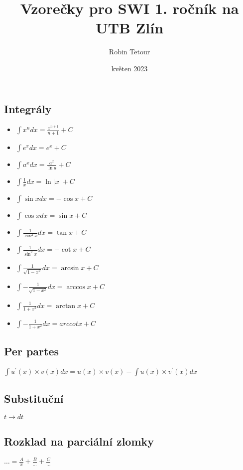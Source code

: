 \documentclass{article}
\title{Vzorečky pro SWI 1. ročník na UTB Zlín}
\author{Robin Tetour}
\date{květen 2023}
\providecommand{\arccot}{arccot}
\begin{document}
\begin{multicols}{4}
\section{Integrály}
\begin{itemize}
    \item $\int x^{n}dx=\frac{x^{n+1}}{n+1}+C$
    \item $\int e^{x}dx=e^{x}+C$
    \item $\int a^{x}dx=\frac{a^{x}}{\ln a}+C$
    \item $\int\frac{1}{x}dx=\ln\left|x\right|+C$
    \item $\int\sin xdx=-\cos x+C$
    \item $\int\cos xdx=\sin x+C$
    \item $\int\frac{1}{\cos^{2}x}dx=\tan x+C$
    \item $\int\frac{1}{\sin^{2}x}dx=-\cot x+C$
    \item $\int\frac{1}{\sqrt{1-x^{2}}}dx=\arcsin x+C$
    \item $\int-\frac{1}{\sqrt{1-x^{2}}}dx=\arccos x+C$
    \item $\int\frac{1}{1+x^{2}}dx=\arctan x+C$
    \item $\int-\frac{1}{1+x^{2}}dx=\arccot x+C$
\end{itemize}
\subsection{Per partes}
$\int u^{\prime}\left(x\right)\times v\left(x\right)dx=u\left(x\right)\times v\left(x\right)-\int u\left(x\right)\times v^{\prime}\left(x\right)dx$
\subsection{Substituční}
$t\rightarrow dt$
\subsection{Rozklad na parciální zlomky}
$\ldots=\frac{A}{x}+\frac{B}{\ldots}+\frac{C}{\ldots}$

\end{multicols}
\end{document}
